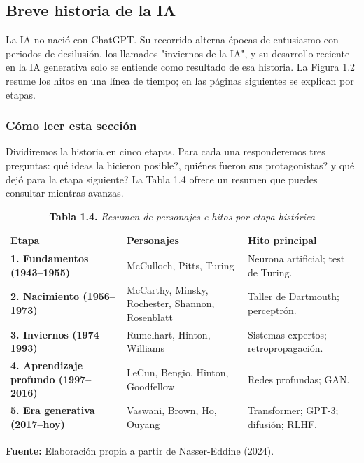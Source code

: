 \vspace{0.3cm}

\subsection{Breve historia de la IA}

La IA no nació con ChatGPT. Su recorrido alterna épocas de entusiasmo con periodos de desilusión, los llamados "inviernos de la IA", y su desarrollo reciente en la IA generativa solo se entiende como resultado de esa historia. La Figura 1.2 resume los hitos en una línea de tiempo; en las páginas siguientes se explican por etapas.

\subsubsection{Cómo leer esta sección}
Dividiremos la historia en cinco etapas. Para cada una responderemos tres preguntas: \textquestiondown qué ideas la hicieron posible?, \textquestiondown quiénes fueron sus protagonistas? y \textquestiondown qué dejó para la etapa siguiente? La Tabla 1.4 ofrece un resumen que puedes consultar mientras avanzas.

\begin{table}[htpb!]
\centering
\small\sffamily
\caption{\textbf{Tabla 1.4.} \textit{Resumen de personajes e hitos por etapa histórica}}
\vspace{0.15cm}
\begin{tabularx}{\textwidth}{>{\bfseries}p{4.0cm} >{\raggedright\arraybackslash}p{4.5cm} >{\raggedright\arraybackslash}X}
\toprule
Etapa & Personajes & Hito principal \\
\midrule
1. Fundamentos (1943--1955) & McCulloch, Pitts, Turing & Neurona artificial; test de Turing. \\
\midrule
2. Nacimiento (1956--1973) & McCarthy, Minsky, Rochester, Shannon, Rosenblatt & Taller de Dartmouth; perceptrón. \\
\midrule
3. Inviernos (1974--1993) & Rumelhart, Hinton, Williams & Sistemas expertos; retropropagación. \\
\midrule
4. Aprendizaje profundo (1997--2016) & LeCun, Bengio, Hinton, Goodfellow & Redes profundas; GAN. \\
\midrule
5. Era generativa (2017--hoy) & Vaswani, Brown, Ho, Ouyang & Transformer; GPT-3; difusión; RLHF. \\
\bottomrule
\end{tabularx}
\vspace{0.15cm}
\raggedright\scriptsize \textbf{Fuente:} Elaboración propia a partir de Nasser-Eddine (2024).
\end{table}

